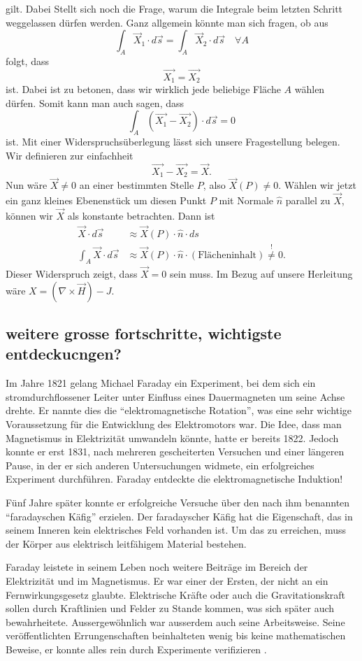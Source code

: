 gilt.
Dabei Stellt sich noch die Frage, warum die Integrale beim letzten Schritt weggelassen dürfen werden.
Ganz allgemein könnte man sich fragen, ob aus
\[
\int_A \vec{X}_1 \cdot d\vec{s} = \int_A \vec{X}_2 \cdot d\vec{s}
\quad \forall A
\]
folgt, dass
\[
\vec{X_1} = \vec{X_2}
\]
ist. Dabei ist zu betonen, dass wir wirklich jede beliebige Fläche $A$ wählen dürfen.
Somit kann man auch sagen, dass
\[
\int_A (\vec{X_1}-\vec{X_2}) \cdot d\vec{s} = 0
\]
ist.
Mit einer Widerspruchsüberlegung lässt sich unsere Fragestellung belegen.
Wir definieren zur einfachheit
\[
\vec{X_1}-\vec{X_2} = \vec{X}.
\]
Nun wäre $\vec{X} \ne 0$ an einer bestimmten Stelle $P$, also $\vec{X}(P) \ne 0$. Wählen wir jetzt ein ganz kleines Ebenenstück um diesen Punkt $P$ mit Normale $\hat{n}$ parallel zu $\vec{X}$, können wir $\vec{X}$ als konstante betrachten.
Dann ist
\begin{align*}
	\vec{X} \cdot d\vec{s} 
	&\approx
	\vec{X}(P) \cdot \hat{n} \cdot ds
	\\
	\int_{A} \vec{X} \cdot d\vec{s}
	&\approx
	\vec{X}(P) \cdot \hat{n} \cdot (\text{Flächeninhalt}) \overset{!}{\ne} 0.
\end{align*}
Dieser Widerspruch zeigt, dass $\vec{X} = 0$ sein muss. Im Bezug auf unsere Herleitung wäre $X = (\nabla \times \vec{H}) - J$.
\subsection{weitere grosse fortschritte, wichtigste entdeckucngen?}

Im Jahre 1821 gelang Michael Faraday ein Experiment, bei dem sich ein stromdurchflossener Leiter unter Einfluss eines Dauermagneten um seine Achse drehte.
Er nannte dies die ``elektromagnetische Rotation'', was eine sehr wichtige Voraussetzung für die Entwicklung des Elektromotors war.
Die Idee, dass man Magnetismus in Elektrizität umwandeln könnte, hatte er bereits 1822.
Jedoch konnte er erst 1831, nach mehreren gescheiterten Versuchen und einer längeren Pause, in der er sich anderen Untersuchungen widmete, ein erfolgreiches Experiment durchführen.
Faraday entdeckte die elektromagnetische Induktion!

Fünf Jahre später konnte er erfolgreiche Versuche über den nach ihm benannten ``faradayschen Käfig'' erzielen.
Der faradayscher Käfig hat die Eigenschaft, das in seinem Inneren kein elektrisches Feld vorhanden ist.
Um das zu erreichen, muss der Körper aus elektrisch leitfähigem Material bestehen.

Faraday leistete in seinem Leben noch weitere Beiträge im Bereich der Elektrizität und im Magnetismus. 
Er war einer der Ersten, der nicht an ein Fernwirkungsgesetz glaubte.
Elektrische Kräfte oder auch die Gravitationskraft sollen durch Kraftlinien und Felder zu Stande kommen, was sich später auch bewahrheitete.
Aussergewöhnlich war ausserdem auch seine Arbeitsweise.
Seine veröffentlichten Errungenschaften beinhalteten wenig bis keine mathematischen Beweise, er konnte alles rein durch Experimente verifizieren \cite{maxwell:Michael_Faraday}.

